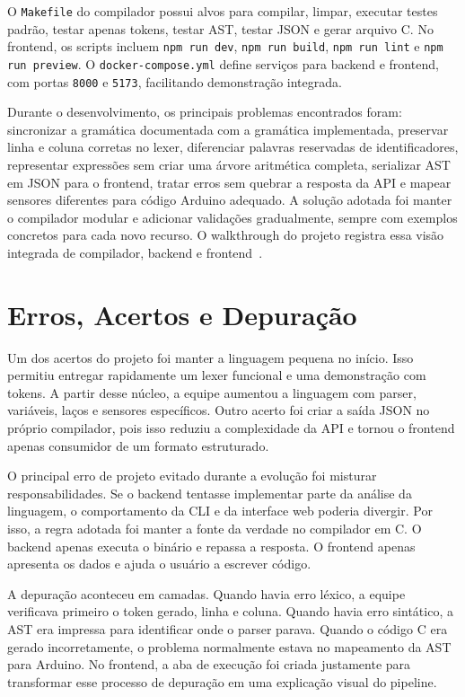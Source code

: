 \documentclass[conference]{IEEEtran}
\begin{document}
O \texttt{Makefile} do compilador possui alvos para compilar, limpar, executar testes padrão, testar apenas tokens, testar AST, testar JSON e gerar arquivo C. No frontend, os scripts incluem \texttt{npm run dev}, \texttt{npm run build}, \texttt{npm run lint} e \texttt{npm run preview}. O \texttt{docker-compose.yml} define serviços para backend e frontend, com portas \texttt{8000} e \texttt{5173}, facilitando demonstração integrada.

Durante o desenvolvimento, os principais problemas encontrados foram: sincronizar a gramática documentada com a gramática implementada, preservar linha e coluna corretas no lexer, diferenciar palavras reservadas de identificadores, representar expressões sem criar uma árvore aritmética completa, serializar AST em JSON para o frontend, tratar erros sem quebrar a resposta da API e mapear sensores diferentes para código Arduino adequado. A solução adotada foi manter o compilador modular e adicionar validações gradualmente, sempre com exemplos concretos para cada novo recurso. O walkthrough do projeto registra essa visão integrada de compilador, backend e frontend~\cite{docs-project}.

\section{Erros, Acertos e Depuração}

Um dos acertos do projeto foi manter a linguagem pequena no início. Isso permitiu entregar rapidamente um lexer funcional e uma demonstração com tokens. A partir desse núcleo, a equipe aumentou a linguagem com parser, variáveis, laços e sensores específicos. Outro acerto foi criar a saída JSON no próprio compilador, pois isso reduziu a complexidade da API e tornou o frontend apenas consumidor de um formato estruturado.

O principal erro de projeto evitado durante a evolução foi misturar responsabilidades. Se o backend tentasse implementar parte da análise da linguagem, o comportamento da CLI e da interface web poderia divergir. Por isso, a regra adotada foi manter a fonte da verdade no compilador em C. O backend apenas executa o binário e repassa a resposta. O frontend apenas apresenta os dados e ajuda o usuário a escrever código.

A depuração aconteceu em camadas. Quando havia erro léxico, a equipe verificava primeiro o token gerado, linha e coluna. Quando havia erro sintático, a AST era impressa para identificar onde o parser parava. Quando o código C era gerado incorretamente, o problema normalmente estava no mapeamento da AST para Arduino. No frontend, a aba de execução foi criada justamente para transformar esse processo de depuração em uma explicação visual do pipeline.
\end{document}
